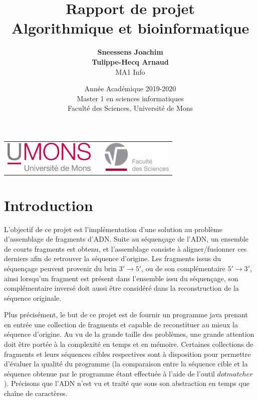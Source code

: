 \documentclass{article}
\title{
{\Huge \textbf{Rapport de projet}\\
Algorithmique et bioinformatique}}
\author{\textbf{Sneessens Joachim}\\\textbf{Tulippe-Hecq Arnaud}\\MA1 Info}
\date{Année Académique 2019-2020\\
Master 1 en sciences informatiques\\
\vspace{1cm}
Faculté des Sciences, Université de Mons}
\begin{document}
\maketitle

\vspace{9cm}

\begin{center}
\begin{tabular}[t]{c c c}
\includegraphics[height=1.5cm]{logoumons.jpg} &
\hspace{1cm} &
\includegraphics[height=1.5cm]{logofs.jpg}
\end{tabular}
\end{center}



\newpage

\section{Introduction}


L'objectif de ce projet est l'implémentation d'une solution au problème d'assemblage de fragments d'ADN. Suite au séquençage de l'ADN, un ensemble de courts fragments est obtenu, et l'assemblage consiste à aligner/fusionner ces derniers afin de retrouver la séquence d'origine. Les fragments issus du séquençage peuvent provenir du brin $3' \to 5'$, ou de son complémentaire $5' \to 3'$, ainsi lorsqu'un fragment est présent dans l'ensemble issu du séquençage, son complémentaire inversé doit aussi être considéré dans la reconstruction de la séquence originale.

Plus précisément, le but de ce projet est de fournir un programme java prenant en entrée une collection de fragments et capable de reconstituer au mieux la séquence d'origine. Au vu de la grande taille des problèmes, une grande attention doit être portée à la complexité en temps et en mémoire. Certaines collections de fragments et leurs séquences cibles respectives sont à disposition pour permettre d'évaluer la qualité du programme (la comparaison entre la séquence cible et la séquence obtenue par le 
programme étant effectuée à l'aide de l'outil $dotmatcher$).
Précisons que l'ADN n'est vu et traité que sous son abstraction en temps que chaîne de caractères.
\end{document}
